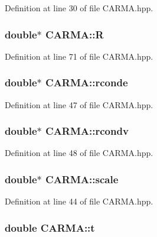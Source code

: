 Definition at line 30 of file C\-A\-R\-M\-A.\-hpp.

\hypertarget{class_c_a_r_m_a_a40823ba436816d4e656185a3ae8a125f}{
\subsubsection[{R}]{\setlength{\rightskip}{0pt plus 5cm}double$\ast$ C\-A\-R\-M\-A\-::\-R}}\label{class_c_a_r_m_a_a40823ba436816d4e656185a3ae8a125f}


Definition at line 71 of file C\-A\-R\-M\-A.\-hpp.

\hypertarget{class_c_a_r_m_a_abd47e4fb92d1a455aa1702a2242825d0}{
\subsubsection[{rconde}]{\setlength{\rightskip}{0pt plus 5cm}double$\ast$ C\-A\-R\-M\-A\-::rconde}}\label{class_c_a_r_m_a_abd47e4fb92d1a455aa1702a2242825d0}


Definition at line 47 of file C\-A\-R\-M\-A.\-hpp.

\hypertarget{class_c_a_r_m_a_a6573aee6903bc05dd601c3355905f68d}{
\subsubsection[{rcondv}]{\setlength{\rightskip}{0pt plus 5cm}double$\ast$ C\-A\-R\-M\-A\-::rcondv}}\label{class_c_a_r_m_a_a6573aee6903bc05dd601c3355905f68d}


Definition at line 48 of file C\-A\-R\-M\-A.\-hpp.

\hypertarget{class_c_a_r_m_a_ada896ef5d67dad63fb8671be1889b42a}{
\subsubsection[{scale}]{\setlength{\rightskip}{0pt plus 5cm}double$\ast$ C\-A\-R\-M\-A\-::scale}}\label{class_c_a_r_m_a_ada896ef5d67dad63fb8671be1889b42a}


Definition at line 44 of file C\-A\-R\-M\-A.\-hpp.

\hypertarget{class_c_a_r_m_a_a47e298ceac5c77b96f70f520119d0eb7}{
\subsubsection[{t}]{\setlength{\rightskip}{0pt plus 5cm}double C\-A\-R\-M\-A\-::t}}\label{class_c_a_r_m_a_a47e298ceac5c77b96f70f520119d0eb7}


